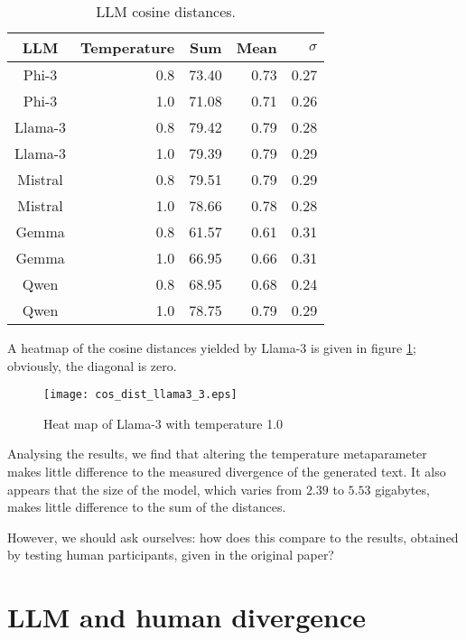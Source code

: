 \documentclass[9pt,a4paper,twoside]{rho-class/rho}
\begin{document}
\begin{table}
\caption{LLM cosine distances.}
\label{divergence_res1}
\begin{tabular}{crrrr}
\toprule
\textbf{LLM} & \textbf{Temperature} & \textbf{Sum} & \textbf{Mean} & \textbf{$\sigma$} \\ \hline 
Phi-3 & 0.8 & 73.40 & 0.73 & 0.27 \\
Phi-3 & 1.0 & 71.08 & 0.71 & 0.26 \\
Llama-3 & 0.8 & 79.42 & 0.79 & 0.28 \\
Llama-3 & 1.0 & 79.39 & 0.79 & 0.29 \\
Mistral & 0.8 & 79.51 & 0.79 & 0.29 \\
Mistral & 1.0 & 78.66 & 0.78 & 0.28 \\
Gemma & 0.8 & 61.57 & 0.61 & 0.31 \\
Gemma & 1.0 & 66.95 & 0.66 & 0.31 \\
Qwen & 0.8 & 68.95 & 0.68 & 0.24 \\
Qwen & 1.0 & 78.75 & 0.79 & 0.29 \\ \hline
\end{tabular}
\end{table}
A heatmap of the cosine distances yielded by Llama-3 is given in figure \ref{fig:llama3_heatmap}; obviously, the diagonal is zero. 

\begin{figure}
  \centering
  \texttt{[image: cos\_dist\_llama3\_3.eps]}
  \caption{Heat map of Llama-3 with temperature 1.0}
  \label{fig:llama3_heatmap}
\end{figure}
Analysing the results, we find that altering the temperature metaparameter makes little difference to the measured divergence of the generated text. It also appears that the size of the model, which varies from $2.39$ to $5.53$ gigabytes, makes little difference to the sum of the distances. 

However, we should ask ourselves: how does this compare to the results, obtained by testing human participants, given in the original paper?

\section{LLM and human divergence}
\end{document}
